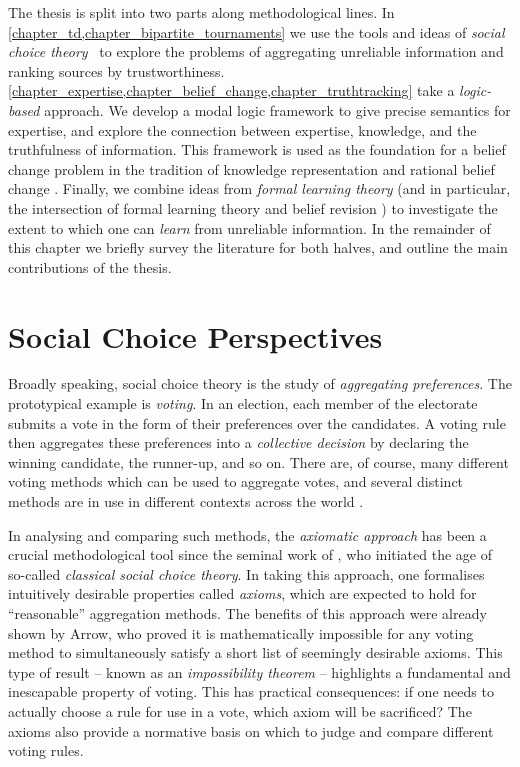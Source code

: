 The thesis is split into two parts along methodological lines. In
\cref{chapter_td,chapter_bipartite_tournaments} we use the tools and ideas of
\emph{social choice theory}~\cite{zwicker2016voting} to explore the problems of
aggregating unreliable information and ranking sources by trustworthiness.
%
%
\cref{chapter_expertise,chapter_belief_change,chapter_truthtracking} take a
\emph{logic-based} approach. We develop a modal logic framework to give precise
semantics for expertise, and explore the connection between expertise,
knowledge, and the truthfulness of information. This framework is used as the
foundation for a belief change problem in the tradition of knowledge
representation and rational belief change . Finally, we combine ideas
from \emph{formal learning theory}  (and in particular, the
intersection of formal learning theory and belief revision ) to
investigate the extent to which one can \emph{learn} from unreliable
information.
%
In the remainder of this chapter we briefly survey the literature for both
halves, and outline the main contributions of the thesis.

\section{Social Choice Perspectives}
\label{intro_sec_social_choice_perspectives}

Broadly speaking, social choice theory is the study of \emph{aggregating
preferences}. The prototypical example is \emph{voting}. In an election, each
member of the electorate submits a vote in the form of their preferences over
the candidates. A voting rule then aggregates these preferences into a
\emph{collective decision} by declaring the winning candidate, the runner-up,
and so on. There are, of course, many different voting methods which can be
used to aggregate votes, and several distinct methods are in use in different
contexts across the world .

In analysing and comparing such methods, the \emph{axiomatic approach} has been
a crucial methodological tool since the seminal work of \textcite{arrow1952},
who initiated the age of so-called \emph{classical social choice theory}. In
taking this approach, one formalises intuitively desirable properties called
\emph{axioms}, which are expected to hold for ``reasonable'' aggregation
methods. The benefits of this approach were already shown by Arrow, who proved
it is mathematically impossible for any voting method to simultaneously satisfy
a short list of seemingly desirable axioms. This type of result -- known as an
\emph{impossibility theorem} -- highlights a fundamental and inescapable
property of voting.\footnotemark{} This has practical consequences: if one
needs to actually choose a rule for use in a vote, which axiom will be
sacrificed? The axioms also provide a normative basis on which to judge and
compare different voting rules.

